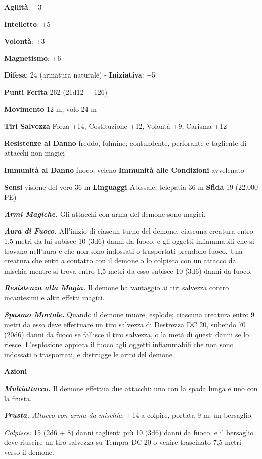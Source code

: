 \begin{multicols}{2}
\textbf{Agilità}: +3

\textbf{Intelletto}: +5

\textbf{Volontà}: +3

\textbf{Magnetismo}: +6

\textbf{Difesa}: 24 (armatura naturale) - \textbf{Iniziativa}: +5

\textbf{Punti Ferita} 262 (21d12 + 126)

\textbf{Movimento} 12 m, volo 24 m

\textbf{Tiri Salvezza} Forza +14, Costituzione +12, Volontà +9, Carisma
+12

\textbf{Resistenze al Danno} freddo, fulmine; contundente, perforante e
tagliente di attacchi non magici

\textbf{Immunità al Danno} fuoco, veleno \textbf{Immunità alle
Condizioni} avvelenato

\textbf{Sensi} visione del vero 36 m
\textbf{Linguaggi} Abissale, telepatia 36 m \textbf{Sfida} 19 (22.000
PE)

\emph{\textbf{Armi Magiche.}} Gli attacchi con arma del demone sono
magici.

\emph{\textbf{Aura di Fuoco.}} All'inizio di ciascun turno del demone,
ciascuna creatura entro 1,5 metri da lui subisce 10 (3d6) danni da
fuoco, e gli oggetti infiammabili che si trovano nell'aura e che non
sono indossati o trasportati prendono fuoco. Una creatura che entri a
contatto con il demone o lo colpisca con un attacco da mischia mentre si
trova entro 1,5 metri da esso subisce 10 (3d6) danni da fuoco.

\emph{\textbf{Resistenza alla Magia.}} Il demone ha vantaggio ai tiri
salvezza contro incantesimi e altri effetti magici.

\emph{\textbf{Spasmo Mortale.}} Quando il demone muore, esplode;
ciascuna creatura entro 9 metri da esso deve effettuare un tiro salvezza
di Destrezza DC 20, subendo 70 (20d6) danni da fuoco se fallisce il tiro
salvezza, o la metà di questi danni se lo riesce. L'esplosione appicca
il fuoco agli oggetti infiammabili che non sono indossati o trasportati,
e distrugge le armi del demone.

\textbf{Azioni}

\emph{\textbf{Multiattacco.}} Il demone effettua due attacchi: uno con
la spada lunga e uno con la frusta.

\emph{\textbf{Frusta.} Attacco con arma da mischia}: +14 a colpire,
portata 9 m, un bersaglio.

\emph{Colpisce:} 15 (2d6 + 8) danni taglienti più 10 (3d6) danni da
fuoco, e il bersaglio deve riuscire un tiro salvezza su Tempra DC 20 o
venire trascinato 7,5 metri verso il demone.


\end{multicols}
